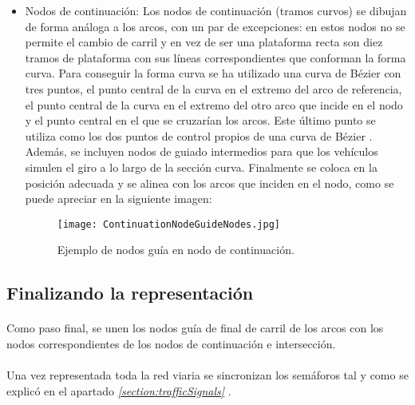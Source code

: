 \begin{itemize}
	\item Nodos de continuación:
	\newline
	\newline
	Los nodos de continuación (tramos curvos) se dibujan de forma análoga a los arcos, con un par de excepciones: en estos nodos no se permite el cambio de carril y en vez de ser una plataforma recta son diez tramos de plataforma con sus líneas correspondientes que conforman la forma curva.
	\newline
	\newline
	Para conseguir la forma curva se ha utilizado una curva de Bézier \cite{BezierCurves} con tres puntos, el punto central de la curva en el extremo del arco de referencia, el punto central de la curva en el extremo del otro arco que incide en el nodo y el punto central en el que se cruzarían los arcos. Este último punto se utiliza como los dos puntos de control propios de una curva de Bézier \cite{BezierCurves}.
	\newline
	\newline
	Además, se incluyen nodos de guiado intermedios para que los vehículos simulen el giro a lo largo de la sección curva. Finalmente se coloca en la posición adecuada y se alinea con los arcos que inciden en el nodo, como se puede apreciar en la siguiente imagen:
	
	\begin{figure}[H]
		\centering
			\texttt{[image: ContinuationNodeGuideNodes.jpg]}
	\caption{Ejemplo de nodos guía en nodo de continuación.}
	\label{fig:ContinuationNodeGuideNodes}
	\end{figure}
	
	\end{itemize}
	
	\subsection{Finalizando la representación}
	\paragraph{}
	Como paso final, se unen los nodos guía de final de carril de los arcos con los nodos correspondientes de los nodos de continuación e intersección.
	
	\paragraph{}
	Una vez representada toda la red viaria se sincronizan los semáforos tal y como se explicó en el apartado \emph{\ref{section:trafficSignals} }.
	
